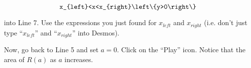 \documentclass{ximera}
\begin{document}
\begin{exercise}
\begin{exercise}
\begin{exercise}
\[
\verb|x_{left}<x<x_{right}\left\{y>0\right\}| 
\]

into Line 7.  Use the expressions you just found for $x_{left}$ and $x_{right}$ (i.e. don't just type ``$x_{left}$'' and ``$x_{right}$'' into Desmos).

Now, go back to Line 5 and set $a=0$.  Click on the ``Play'' icon.   Notice that the area of $R(a)$  as $a$ increases.

\end{exercise}



\end{exercise}

 
\end{exercise}
\end{document}
